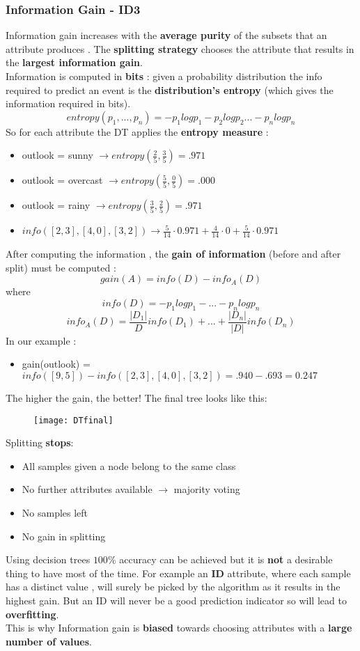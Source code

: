 \subsubsection{Information Gain - ID3}
Information gain increases with the \textbf{average purity} of the subsets that an attribute produces . The \textbf{splitting strategy} chooses the attribute that results in the \textbf{largest information gain}.\\
Information is computed in \textbf{bits} : given a probability distribution the info required to predict an event is the \textbf{distribution's entropy} (which gives the information required in bits).
 $$ entropy(p_1,...,p_n) = -p_1logp_1 - p_2logp_2...-p_nlogp_n$$
So for each attribute the DT applies the \textbf{entropy measure} :
\begin{itemize}
\item outlook = sunny $\rightarrow entropy(\frac{2}{5},\frac{3}{5}) = .971$ 
\item outlook = overcast $\rightarrow entropy(\frac{5}{5},\frac{0}{5}) = .000$
\item outlook = rainy $\rightarrow entropy(\frac{3}{5},\frac{2}{5}) = .971$
\item $info([2,3],[4,0],[3,2]) \rightarrow \frac{5}{14} \cdot 0.971 + \frac{4}{14} \cdot 0 + \frac{5}{14} \cdot 0.971$
\end{itemize}
After computing the information , the \textbf{gain of information} (before and after split) must be computed : 
$$ gain(A) = info(D) - info_A(D)$$
where 
$$ info(D) = -p_1logp_1 - ... -p_nlogp_n$$
$$ info_A(D) = \frac{|D_1|}{D}info(D_1) + ...+  \frac{|D_n|}{|D|}info(D_n)$$
In our example :
\begin{itemize}
\item  gain(outlook) = $info([9,5])-info([2,3],[4,0],[3,2]) = .940 - .693 = 0.247$
\end{itemize}
The higher the gain, the better! The final tree looks like this:
\begin{figure}[H]
  \centering
  \texttt{[image: DTfinal]}
\end{figure}
Splitting \textbf{stops}:
\begin{itemize}
\item All samples given a node belong to the same class
\item No further attributes available $\rightarrow$ majority voting
\item No samples left
\item No gain in splitting
\end{itemize}
 Using decision trees $100 \% $ accuracy can be achieved but it is \textbf{not} a desirable thing to have most of the time. For example an \textbf{ID} attribute, where each sample has a distinct value , will surely be picked by the algorithm as it results in the highest gain. But an ID will never be a good prediction indicator so will lead to \textbf{overfitting}.\\
 This is why Information gain is \textbf{biased} towards choosing attributes with a \textbf{large number of values}.
 
